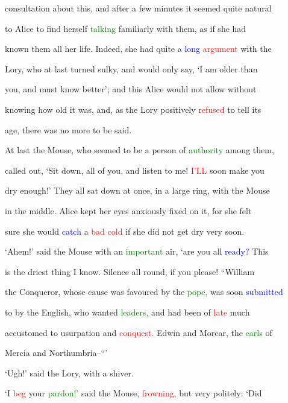  consultation about this, and after a few minutes it seemed quite natural

 to Alice to find herself \textcolor{green}{talking} familiarly with them, as if she had

 known them all her life. Indeed, she had quite a \textcolor{blue}{long} \textcolor{red}{argument} with the

 Lory, who at last turned sulky, and would only say, ‘I am older than

 you, and must know better’; and this Alice would not allow without

 knowing how old it was, and, as the Lory positively \textcolor{red}{refused} to tell its

 age, there was no more to be said.



 At last the Mouse, who seemed to be a person of \textcolor{green}{authority} among them,

 called out, ‘Sit down, all of you, and listen to me! \textcolor{red}{I’LL} soon make you

 dry enough!’ They all sat down at once, in a large ring, with the Mouse

 in the middle. Alice kept her eyes anxiously fixed on it, for she felt

 sure she would \textcolor{blue}{catch} a \textcolor{red}{bad} \textcolor{red}{cold} if she did not get dry very soon.



 ‘Ahem!’ said the Mouse with an \textcolor{green}{important} air, ‘are you all \textcolor{blue}{ready?} This

 is the driest thing I know. Silence all round, if you please! “William

 the Conqueror, whose cause was favoured by the \textcolor{green}{pope,} was soon \textcolor{blue}{submitted}

 to by the English, who wanted \textcolor{green}{leaders,} and had been of \textcolor{red}{late} much

 accustomed to usurpation and \textcolor{red}{conquest.} Edwin and Morcar, the \textcolor{green}{earls} of

 Mercia and Northumbria--“’



 ‘Ugh!’ said the Lory, with a \textcolor{BurntOrange}{shiver.}



 ‘I \textcolor{red}{beg} your \textcolor{green}{pardon!’} said the Mouse, \textcolor{red}{frowning,} but very politely: ‘Did


